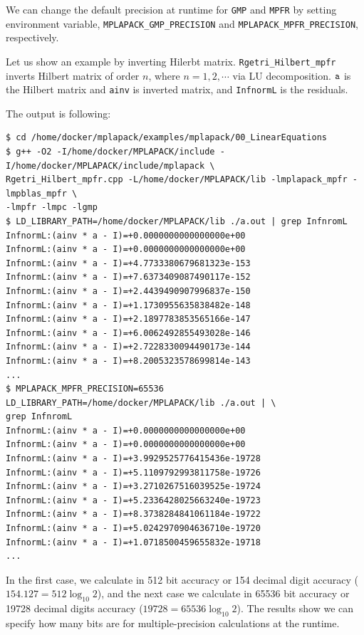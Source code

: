 \documentclass[12pt]{article}
\begin{document}
We can change the default precision at runtime for {\tt GMP} and {\tt MPFR} by setting environment variable,
{\tt MPLAPACK\_GMP\_PRECISION} and {\tt MPLAPACK\_MPFR\_PRECISION}, respectively.

Let us show an example by inverting Hilerbt matrix.
{\tt Rgetri\_Hilbert\_mpfr} inverts Hilbert matrix of order $n$, where $n=1, 2, \cdots $ via LU decomposition. 
${\tt a}$ is the Hilbert matrix and {\tt ainv} is inverted matrix, and {\tt InfnormL} is the residuals. 

The output is following:
\begin{verbatim}
$ cd /home/docker/mplapack/examples/mplapack/00_LinearEquations
$ g++ -O2 -I/home/docker/MPLAPACK/include -I/home/docker/MPLAPACK/include/mplapack \
Rgetri_Hilbert_mpfr.cpp -L/home/docker/MPLAPACK/lib -lmplapack_mpfr -lmpblas_mpfr \
-lmpfr -lmpc -lgmp
$ LD_LIBRARY_PATH=/home/docker/MPLAPACK/lib ./a.out | grep InfnromL 
InfnormL:(ainv * a - I)=+0.0000000000000000e+00
InfnormL:(ainv * a - I)=+0.0000000000000000e+00
InfnormL:(ainv * a - I)=+4.7733380679681323e-153
InfnormL:(ainv * a - I)=+7.6373409087490117e-152
InfnormL:(ainv * a - I)=+2.4439490907996837e-150
InfnormL:(ainv * a - I)=+1.1730955635838482e-148
InfnormL:(ainv * a - I)=+2.1897783853565166e-147
InfnormL:(ainv * a - I)=+6.0062492855493028e-146
InfnormL:(ainv * a - I)=+2.7228330094490173e-144
InfnormL:(ainv * a - I)=+8.2005323578699814e-143
...
$ MPLAPACK_MPFR_PRECISION=65536 LD_LIBRARY_PATH=/home/docker/MPLAPACK/lib ./a.out | \
grep InfnromL 
InfnormL:(ainv * a - I)=+0.0000000000000000e+00
InfnormL:(ainv * a - I)=+0.0000000000000000e+00
InfnormL:(ainv * a - I)=+3.9929525776415436e-19728
InfnormL:(ainv * a - I)=+5.1109792993811758e-19726
InfnormL:(ainv * a - I)=+3.2710267516039525e-19724
InfnormL:(ainv * a - I)=+5.2336428025663240e-19723
InfnormL:(ainv * a - I)=+8.3738284841061184e-19722
InfnormL:(ainv * a - I)=+5.0242970904636710e-19720
InfnormL:(ainv * a - I)=+1.0718500459655832e-19718
...
\end{verbatim}
In the first case, we calculate in 512 bit accuracy or 154 decimal digit accuracy ($154.127 =512 \log_{10}2$), and the next case we calculate in 65536 bit accuracy or 19728 decimal digits accuracy ($19728 = 65536 \log_{10}2$). The results show we can specify how many bits are for multiple-precision calculations at the runtime.
\end{document}

